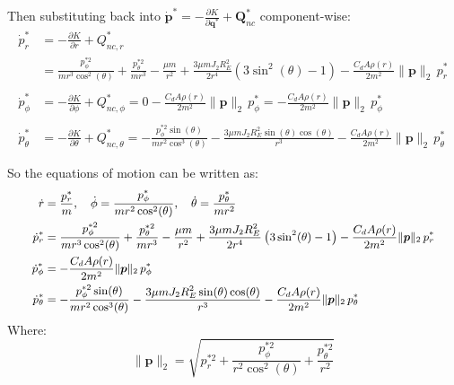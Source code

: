 \documentclass[titlepage]{article}
\begin{document}
Then substituting back into $\dot{\boldsymbol{p}}^*=-\frac{\partial K}{\partial\boldsymbol{q}^*}+\boldsymbol{Q}_{nc}^*$ component-wise:
\begin{equation}
	\begin{split}
		\dot{p}_r^*&=-\frac{\partial K}{\partial r}+Q_{nc,r}^* \\
		&=\frac{p_\phi^{*2}}{mr^3\cos^2(\theta)}+\frac{p_\theta^{*2}}{mr^3}-\frac{\mu m}{r^2}+\frac{3\mu mJ_2R_E^2}{2r^4}\left(3\sin^2(\theta)-1\right)-\frac{C_dA\rho(r)}{2m^2}\|\boldsymbol{p}\|_2\,p_r^* \\
		\\
		\dot{p}_\phi^*&=-\frac{\partial K}{\partial\phi}+Q_{nc,\phi}^*=0-\frac{C_dA\rho(r)}{2m^2}\|\boldsymbol{p}\|_2\,p_\phi^*=-\frac{C_dA\rho(r)}{2m^2}\|\boldsymbol{p}\|_2\,p_\phi^* \\
		\\
		\dot{p}_\theta^*&=-\frac{\partial K}{\partial\theta}+Q_{nc,\theta}^*=-\frac{p_\phi^{*2}\sin(\theta)}{mr^2\cos^3(\theta)}-\frac{3\mu mJ_2R_E^2\sin(\theta)\cos(\theta)}{r^3}-\frac{C_dA\rho(r)}{2m^2}\|\boldsymbol{p}\|_2\,p_\theta^*
	\end{split}
\end{equation}

\begin{mdframed}[linewidth=1pt, innertopmargin=10pt, innerbottommargin=10pt]
	So the equations of motion can be written as:
	\begin{equation}
		\small
		\begin{split}
			\dot{r}&=\frac{p_r^*}{m},\quad \dot{\phi}=\frac{p_\phi^*}{mr^2\cos^2(\theta)},\quad \dot{\theta}=\frac{p_\theta^*}{mr^2} \\
			\dot{p}_r^*&=\frac{p_\phi^{*2}}{mr^3\cos^2(\theta)}+\frac{p_\theta^{*2}}{mr^3}-\frac{\mu m}{r^2}+\frac{3\mu mJ_2R_E^2}{2r^4}\left(3\sin^2(\theta)-1\right)-\frac{C_dA\rho(r)}{2m^2}\|\boldsymbol{p}\|_2\,p_r^* \\
			\dot{p}_\phi^*&=-\frac{C_dA\rho(r)}{2m^2}\|\boldsymbol{p}\|_2\,p_\phi^* \\
			\dot{p}_\theta^*&=-\frac{p_\phi^{*2}\sin(\theta)}{mr^2\cos^3(\theta)}-\frac{3\mu mJ_2R_E^2\sin(\theta)\cos(\theta)}{r^3}-\frac{C_dA\rho(r)}{2m^2}\|\boldsymbol{p}\|_2\,p_\theta^*
		\end{split}
		\normalsize
	\end{equation}
	Where:
	\begin{equation}
		\|\boldsymbol{p}\|_2=\sqrt{p_r^{*2}+\frac{p_\phi^{*2}}{r^2\cos^2(\theta)}+\frac{p_\theta^{*2}}{r^2}}
	\end{equation}
\end{mdframed}
\end{document}
